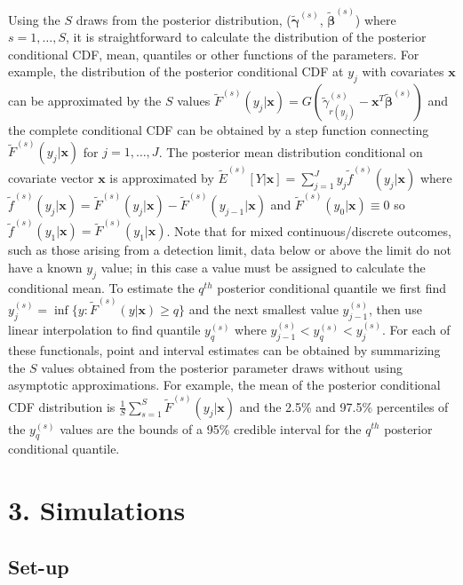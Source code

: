 \documentclass[
]{article}
\begin{document}
Using the \(S\) draws from the posterior distribution, (\(\tilde{\boldsymbol{\gamma}}^{(s)}\), \(\tilde{\boldsymbol{\beta}}^{(s)}\)) where \(s=1,\ldots,S\), it is straightforward to calculate the distribution of the posterior conditional CDF, mean, quantiles or other functions of the parameters. For example, the distribution of the posterior conditional CDF at \(y_j\) with covariates \(\boldsymbol{x}\) can be approximated by the \(S\) values \(\tilde{F}^{(s)}(y_j|\boldsymbol{x})=G(\tilde{\gamma}_{r(y_j)}^{(s)}-\boldsymbol{x}^{T}\tilde{\boldsymbol{\beta}}^{(s)})\) and the complete conditional CDF can be obtained by a step function connecting \(\tilde{F}^{(s)}(y_j|\boldsymbol{x})\) for \(j=1,\ldots,J\). The posterior mean distribution conditional on covariate vector \(\boldsymbol{x}\) is approximated by \(\tilde{E}^{(s)}[Y|\boldsymbol{x}]=\sum_{j=1}^{J}y_j\tilde{f}^{(s)}(y_j|\boldsymbol{x})\) where \(\tilde{f}^{(s)}(y_j|\boldsymbol{x})=\tilde{F}^{(s)}(y_j|\boldsymbol{x})-\tilde{F}^{(s)}(y_{j-1}|\boldsymbol{x})\) and \(\tilde{F}^{(s)}(y_0|\boldsymbol{x}) \equiv 0\) so \(\tilde{f}^{(s)}(y_1|\boldsymbol{x})=\tilde{F}^{(s)}(y_1|\boldsymbol{x})\). Note that for mixed continuous/discrete outcomes, such as those arising from a detection limit, data below or above the limit do not have a known \(y_j\) value; in this case a value must be assigned to calculate the conditional mean. To estimate the \(q^{th}\) posterior conditional quantile we first find \(y_j^{(s)}=\inf\{y:\tilde{F}^{(s)}(y|\boldsymbol{x})\ge q\}\) and the next smallest value \(y_{j-1}^{(s)}\), then use linear interpolation to find quantile \(y_q^{(s)}\) where \(y_{j-1}^{(s)}<y_q^{(s)}<y_j^{(s)}\). For each of these functionals, point and interval estimates can be obtained by summarizing the \(S\) values obtained from the posterior parameter draws without using asymptotic approximations. For example, the mean of the posterior conditional CDF distribution is \(\frac{1}{S}\sum_{s=1}^S\tilde{F}^{(s)}(y_j|\boldsymbol{x})\) and the 2.5\% and 97.5\% percentiles of the \(y_q^{(s)}\) values are the bounds of a 95\% credible interval for the \(q^{th}\) posterior conditional quantile.

\hypertarget{simulations}{%
\section{3. Simulations}\label{simulations}}

\hypertarget{set-up}{%
\subsection{Set-up}\label{set-up}}
\end{document}
